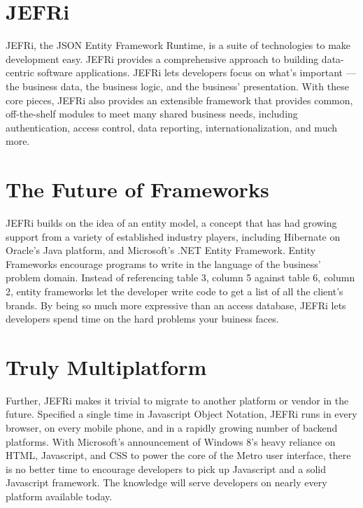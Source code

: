 \documentclass{article}
\begin{document}
\maketitle
\tableofcontents
\newpage
\linespread{1.6}

\section{JEFRi}
JEFRi, the JSON Entity Framework Runtime, is a suite of technologies to
make development easy. JEFRi provides a comprehensive approach to building
data-centric software applications. JEFRi lets developers focus on what's important
--- the business data, the business logic, and the business' presentation. With
these core pieces, JEFRi also provides an extensible framework that provides
common, off-the-shelf modules to meet many shared business needs, including
authentication, access control, data reporting, internationalization, and much
more.

\section{The Future of Frameworks}
JEFRi builds on the idea of an entity model, a concept that has had growing
support from a variety of established industry players, including Hibernate on
Oracle's Java platform, and Microsoft's .NET Entity Framework. Entity Frameworks
encourage programs to write in the language of the business' problem domain.
Instead of referencing table 3, column 5 against table 6, column 2, entity
frameworks let the developer write code to get a list of all the client's
brands. By being so much more expressive than an access database, JEFRi lets
developers spend time on the hard problems your buiness faces.

\section{Truly Multiplatform}
Further, JEFRi makes it trivial to migrate to another platform or vendor in the
future. Specified a single time in Javascript Object Notation, JEFRi runs in every browser, on every mobile
phone, and in a rapidly growing number of backend platforms. With Microsoft's
announcement of Windows 8's heavy reliance on HTML, Javascript, and CSS to power
the core of the Metro user interface, there is no better time to encourage developers
to pick up Javascript and a solid Javascript framework. The knowledge will serve
developers on nearly every platform available today.
\end{document}
